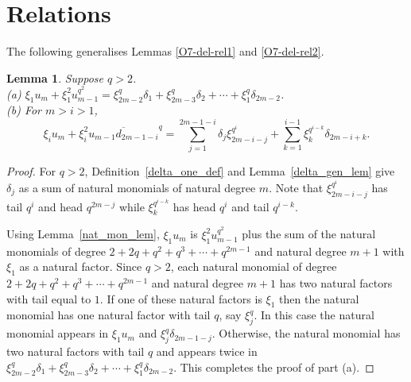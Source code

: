 \documentclass{amsart}
\newtheorem{lemma}[subsection]{Lemma}
\begin{document}
\section{Relations}\label{sec: relations}

The following generalises Lemmas \ref{O7-del-rel1} and \ref{O7-del-rel2}.
\begin{lemma} \label{del_rel} Suppose $q>2$.\\
(a) $\xi_1u_m+\xi_1^2u_{m-1}^{q^2}=\xi_{2m-2}^q\delta_1+\xi_{2m-3}^q\delta_2+\cdots+\xi_1^q\delta_{2m-2}$.\\
(b) For $m>i>1$,
$$\xi_iu_m+\xi_i^2\overline{u_{m-1}d_{2m-1-i}}^q=\sum_{j=1}^{2m-1-i}\delta_j\xi_{2m-i-j}^{q^i}+\sum_{k=1}^{i-1}\xi_k^{q^{i-k}}\delta_{2m-i+k}.$$
\end{lemma}

\begin{proof} For $q>2$, Definition~\ref{delta_one_def} and
Lemma~\ref{delta_gen_lem} give $\delta_j$ as a sum of natural monomials
of natural degree $m$. Note that $\xi_{2m-i-j}^{q^i}$ has tail $q^i$
and head $q^{2m-j}$ while $\xi_k^{q^{i-k}}$ has head $q^i$ and tail $q^{i-k}$.

Using Lemma~\ref{nat_mon_lem}, $\xi_1 u_m$ is $\xi_1^2 u_{m-1}^{q^2}$ plus the sum of the natural monomials of degree
$2+2q+q^2+q^3+\cdots +q^{2m-1}$ and natural degree $m+1$ with $\xi_1$ as a natural factor.
Since $q>2$, each natural monomial of degree $2+2q+q^2+q^3+\cdots +q^{2m-1}$ 
and natural degree $m+1$ has two natural factors with tail equal to $1$.
If one of these natural factors is $\xi_1$ then the natural monomial has one natural factor with tail $q$, say $\xi_j^q$.
In this case the natural monomial appears in $\xi_1 u_m$ and $\xi_j^q\delta_{2m-1-j}$. Otherwise, the natural monomial has
two natural factors with tail $q$ and appears twice in $\xi_{2m-2}^q\delta_1+\xi_{2m-3}^q\delta_2+\cdots+\xi_1^q\delta_{2m-2}$.
This completes the proof of part (a).


\end{proof}
\end{document}
